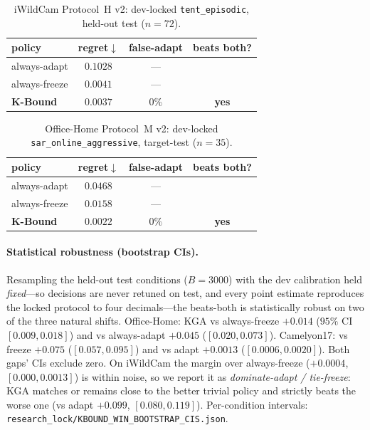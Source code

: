 \documentclass[11pt]{article}
\theoremstyle{plain}
\theoremstyle{definition}
\theoremstyle{remark}
\begin{document}
\begin{table}[t]\centering\small
\caption{iWildCam Protocol~H v2: dev-locked \texttt{tent\_episodic}, held-out test ($n{=}72$).}
\label{tab:iwildcam-H}
\begin{tabular}{lccc}
\toprule
policy & regret$\downarrow$ & false-adapt & beats both? \\
\midrule
always-adapt  & $0.1028$ & --- & \\
always-freeze & $0.0041$ & --- & \\
\textbf{K-Bound} & $\mathbf{0.0037}$ & $0\%$ & \textbf{yes} \\
\bottomrule
\end{tabular}
\end{table}

\begin{table}[t]\centering\small
\caption{Office-Home Protocol~M v2: dev-locked \texttt{sar\_online\_aggressive}, target-test ($n{=}35$).}
\label{tab:officehome-M}
\begin{tabular}{lccc}
\toprule
policy & regret$\downarrow$ & false-adapt & beats both? \\
\midrule
always-adapt  & $0.0468$ & --- & \\
always-freeze & $0.0158$ & --- & \\
\textbf{K-Bound} & $\mathbf{0.0022}$ & $0\%$ & \textbf{yes} \\
\bottomrule
\end{tabular}
\end{table}

\paragraph{Statistical robustness (bootstrap CIs).}
Resampling the held-out test conditions ($B{=}3000$) with the dev calibration held
\emph{fixed}---so decisions are never retuned on test, and every point estimate reproduces
the locked protocol to four decimals---the beats-both is statistically robust on two of the
three natural shifts. Office-Home: \textsc{KGA} vs always-freeze $+0.014$ ($95\%$ CI
$[0.009,0.018]$) and vs always-adapt $+0.045$ ($[0.020,0.073]$). Camelyon17: vs freeze
$+0.075$ ($[0.057,0.095]$) and vs adapt $+0.0013$ ($[0.0006,0.0020]$). Both gaps' CIs exclude
zero. On iWildCam the margin over always-freeze ($+0.0004$, $[0.000,0.0013]$) is within noise,
so we report it as \emph{dominate-adapt / tie-freeze}: \textsc{KGA} matches or remains close to
the better trivial policy and strictly beats the worse one (vs adapt $+0.099$,
$[0.080,0.119]$). Per-condition intervals: \texttt{research\_lock/KBOUND\_WIN\_BOOTSTRAP\_CIS.json}.
\end{document}
